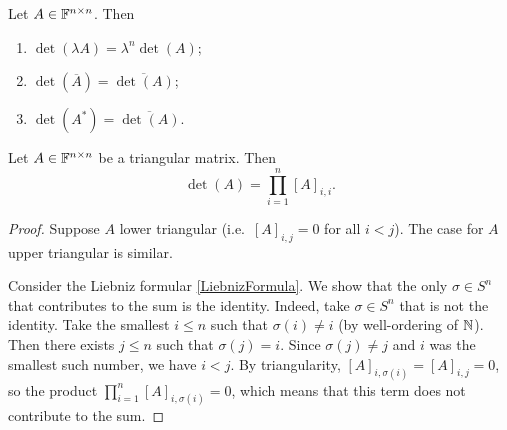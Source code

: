 \begin{lemma}
Let $A\in\mathbb{F}^{n\times n}$. Then
\begin{enumerate}
\item $\det(\lambda A) = \lambda^n\det(A)$;
\item $\det(\overline{A}) = \overline{\det(A)}$;
\item $\det(A^*) = \overline{\det(A)}$.
\end{enumerate}
\end{lemma}

\begin{proposition} \label{determinantTriangularMatrix}
Let $A\in\mathbb{F}^{n\times n}$ be a triangular matrix. Then
\[ \det(A) = \prod_{i=1}^n [A]_{i,i}. \]
\end{proposition}
\begin{proof}
Suppose $A$ lower triangular (i.e.\ $[A]_{i,j} = 0$ for all $i<j$). The case for $A$ upper triangular is similar.

Consider the Liebniz formular \ref{LiebnizFormula}. We show that the only $\sigma\in S^n$ that contributes to the sum is the identity. Indeed, take $\sigma\in S^n$ that is not the identity. Take the smallest $i \leq n$ such that $\sigma(i) \neq i$ (by well-ordering of $\mathbb{N}$). Then there exists $j\leq n$ such that $\sigma(j) = i$. Since $\sigma(j) \neq j$ and $i$ was the smallest such number, we have $i < j$. By triangularity, $[A]_{i, \sigma(i)} = [A]_{i,j} = 0$, so the product $\prod_{i=1}^n [A]_{i,\sigma(i)} = 0$, which means that this term does not contribute to the sum.
\end{proof}

